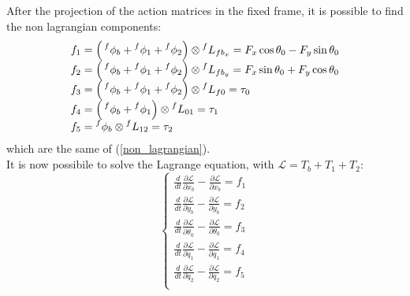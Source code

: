 \documentclass[a4paper,12pt,oneside]{report}
\begin{document}
After the projection of the action matrices in the fixed frame, it is possible to find the non lagrangian components:
\begin{equation}
  \begin{array}{l}
  f_1=\Big(\prescript{f}{}{\phi_b}+\prescript{f}{}{\phi_1}+\prescript{f}{}{\phi_2}\Big)\otimes \prescript{f}{}{L_{fb_x}}=F_x\cos{\theta_0}-F_y\sin{\theta_0}\\
  f_2=\Big(\prescript{f}{}{\phi_b}+\prescript{f}{}{\phi_1}+\prescript{f}{}{\phi_2}\Big)\otimes \prescript{f}{}{L_{fb_y}}=F_x\sin{\theta_0}+F_y\cos{\theta_0}\\
  f_3=\Big(\prescript{f}{}{\phi_b}+\prescript{f}{}{\phi_1}+\prescript{f}{}{\phi_2}\Big)\otimes \prescript{f}{}{L_{f0}}=\tau_0\\
  f_4=\Big(\prescript{f}{}{\phi_b}+\prescript{f}{}{\phi_1}\Big)\otimes \prescript{f}{}{L_{01}}=\tau_1\\
  f_5=\prescript{f}{}{\phi_b}\otimes \prescript{f}{}{L_{12}}=\tau_2
  \end{array}
\end{equation}
which are the same of (\ref{non_lagrangian}).\\
It is now possibile to solve the Lagrange equation, 
with $\mathcal{L}=T_b+T_1+T_2$:
\begin{equation}
  \begin{cases}
    \frac{d}{dt}\frac{\partial \mathcal{L} }{\partial \dot{x}_b}-\frac{\partial \mathcal{L}}{\partial x_b}=f_1\\
    \frac{d}{dt}\frac{\partial \mathcal{L} }{\partial \dot{y}_b}-\frac{\partial \mathcal{L}}{\partial y_b}=f_2\\
    \frac{d}{dt}\frac{\partial \mathcal{L} }{\partial \dot{\theta}_0}-\frac{\partial \mathcal{L}}{\partial \theta_0}=f_3\\
    \frac{d}{dt}\frac{\partial \mathcal{L} }{\partial \dot{q}_1}-\frac{\partial \mathcal{L}}{\partial q_1}=f_4\\
    \frac{d}{dt}\frac{\partial \mathcal{L} }{\partial \dot{q}_2}-\frac{\partial \mathcal{L}}{\partial q_2}=f_5\\
  \end{cases}
\end{equation}
\end{document}
